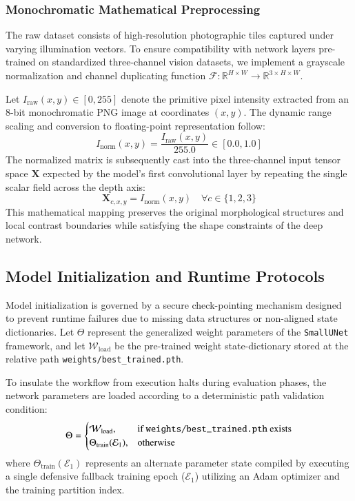 \documentclass{aa}
\begin{document}
\subsubsection{Monochromatic Mathematical Preprocessing}
The raw dataset consists of high-resolution photographic tiles captured under varying illumination vectors. To ensure compatibility with network layers pre-trained on standardized three-channel vision datasets, we implement a grayscale normalization and channel duplicating function $\mathcal{F}: \mathbb{R}^{H \times W} \rightarrow \mathbb{R}^{3 \times H \times W}$.

Let $I_{\text{raw}}(x,y) \in [0, 255]$ denote the primitive pixel intensity extracted from an 8-bit monochromatic PNG image at coordinates $(x,y)$. The dynamic range scaling and conversion to floating-point representation follow:
\begin{equation*}
I_{\text{norm}}(x,y) = \frac{I_{\text{raw}}(x,y)}{255.0} \in [0.0, 1.0]
\end{equation*}
The normalized matrix is subsequently cast into the three-channel input tensor space $\mathbf{X}$ expected by the model's first convolutional layer by repeating the single scalar field across the depth axis:
\begin{equation*}
\mathbf{X}_{c,x,y} = I_{\text{norm}}(x,y) \quad \forall c \in \{1, 2, 3\}
\end{equation*}
This mathematical mapping preserves the original morphological structures and local contrast boundaries while satisfying the shape constraints of the deep network.

\subsection{Model Initialization and Runtime Protocols}
Model initialization is governed by a secure check-pointing mechanism designed to prevent runtime failures due to missing data structures or non-aligned state dictionaries. Let $\Theta$ represent the generalized weight parameters of the \texttt{SmallUNet} framework, and let $\mathcal{W}_{\text{load}}$ be the pre-trained weight state-dictionary stored at the relative path \texttt{weights/best\_trained.pth}.

To insulate the workflow from execution halts during evaluation phases, the network parameters are loaded according to a deterministic path validation condition:
\begin{equation*}
\Theta =
\begin{cases}
\mathcal{W}_{\text{load}}, & \text{if } \text{\texttt{weights/best\_trained.pth}} \text{ exists} \\\Theta_{\text{train}}(\mathcal{E}_1), & \text{otherwise}
\end{cases}
\end{equation*}
where $\Theta_{\text{train}}(\mathcal{E}_1)$ represents an alternate parameter state compiled by executing a single defensive fallback training epoch ($\mathcal{E}_1$) utilizing an Adam optimizer and the training partition index.
\end{document}
